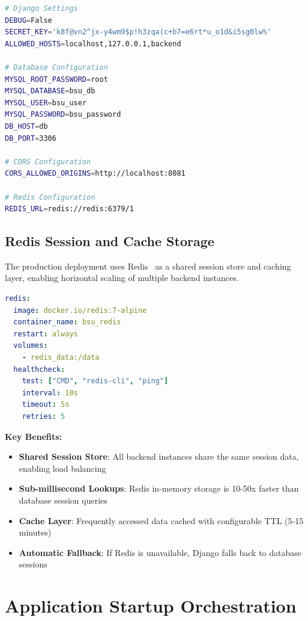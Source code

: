 \begin{lstlisting}[language=bash, caption=Production Environment Configuration (\texttt{.env.production})]
# Django Settings
DEBUG=False
SECRET_KEY='k8f@vn2^jx-y4wm9$p!h3zqa(c+b7=e6rt*u_o1d&i5sg0lw%'
ALLOWED_HOSTS=localhost,127.0.0.1,backend

# Database Configuration
MYSQL_ROOT_PASSWORD=root
MYSQL_DATABASE=bsu_db
MYSQL_USER=bsu_user
MYSQL_PASSWORD=bsu_password
DB_HOST=db
DB_PORT=3306

# CORS Configuration
CORS_ALLOWED_ORIGINS=http://localhost:8081

# Redis Configuration
REDIS_URL=redis://redis:6379/1
\end{lstlisting}

\subsection{Redis Session and Cache Storage}

The production deployment uses Redis~\cite{redis} as a shared session store and caching layer, enabling horizontal scaling of multiple backend instances.

\begin{lstlisting}[float, language=yaml, caption=Redis Service Configuration]
redis:
  image: docker.io/redis:7-alpine
  container_name: bsu_redis
  restart: always
  volumes:
    - redis_data:/data
  healthcheck:
    test: ["CMD", "redis-cli", "ping"]
    interval: 10s
    timeout: 5s
    retries: 5
\end{lstlisting}

\textbf{Key Benefits:}
\begin{itemize}
    \item \textbf{Shared Session Store}: All backend instances share the same session data, enabling load balancing
    \item \textbf{Sub-millisecond Lookups}: Redis in-memory storage is 10-50x faster than database session queries
    \item \textbf{Cache Layer}: Frequently accessed data cached with configurable TTL (5-15 minutes)
    \item \textbf{Automatic Fallback}: If Redis is unavailable, Django falls back to database sessions
\end{itemize}

\section{Application Startup Orchestration}
\label{sec:startup-orchestration}

